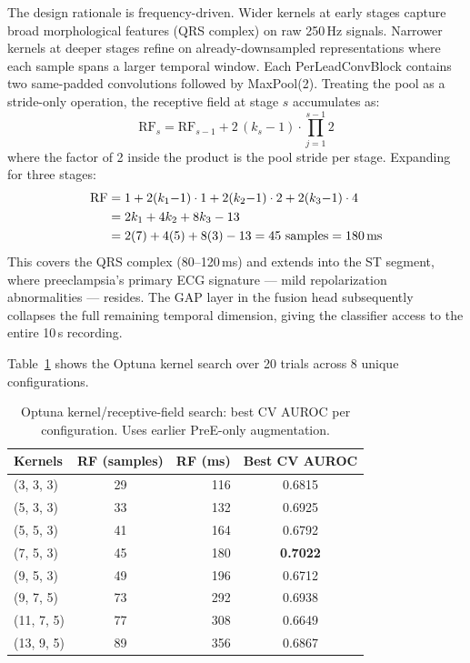 \documentclass[sigconf,nonacm]{acmart}
\begin{document}
The design rationale is frequency-driven. Wider kernels at early stages capture broad morphological features (QRS complex) on raw 250\,Hz signals. Narrower kernels at deeper stages refine on already-downsampled representations where each sample spans a larger temporal window. Each PerLeadConvBlock contains two same-padded convolutions followed by MaxPool(2). Treating the pool as a stride-only operation, the receptive field at stage $s$ accumulates as:
\begin{equation}
\text{RF}_s = \text{RF}_{s-1} + 2\,(k_s - 1) \cdot \prod_{j=1}^{s-1} 2
\end{equation}
where the factor of 2 inside the product is the pool stride per stage. Expanding for three stages:
\begin{align}
\text{RF} &= 1 + 2(k_1{-}1)\cdot 1 + 2(k_2{-}1)\cdot 2 + 2(k_3{-}1)\cdot 4 \notag \\
           &= 2k_1 + 4k_2 + 8k_3 - 13 \notag \\
           &= 2(7) + 4(5) + 8(3) - 13 = 45 \text{ samples} = 180\text{\,ms}
\end{align}
This covers the QRS complex (80--120\,ms) and extends into the ST segment, where preeclampsia's primary ECG signature --- mild repolarization abnormalities --- resides. The GAP layer in the fusion head subsequently collapses the full remaining temporal dimension, giving the classifier access to the entire 10\,s recording.

Table~\ref{tab:rf-search} shows the Optuna kernel search over 20 trials across 8 unique configurations.

\begin{table}[H]
\centering
\caption{Optuna kernel/receptive-field search: best CV AUROC per configuration. Uses earlier PreE-only augmentation.}
\label{tab:rf-search}
\small
\begin{tabular}{lcrc}
\toprule
\textbf{Kernels} & \textbf{RF (samples)} & \textbf{RF (ms)} & \textbf{Best CV AUROC} \\
\midrule
(3, 3, 3)    & 29  & 116  & 0.6815 \\
(5, 3, 3)    & 33  & 132  & 0.6925 \\
(5, 5, 3)    & 41  & 164  & 0.6792 \\
(7, 5, 3)    & 45  & 180  & \textbf{0.7022} \\
(9, 5, 3)    & 49  & 196  & 0.6712 \\
(9, 7, 5)    & 73  & 292  & 0.6938 \\
(11, 7, 5)   & 77  & 308  & 0.6649 \\
(13, 9, 5)   & 89  & 356  & 0.6867 \\
\bottomrule
\end{tabular}
\end{table}
\end{document}
